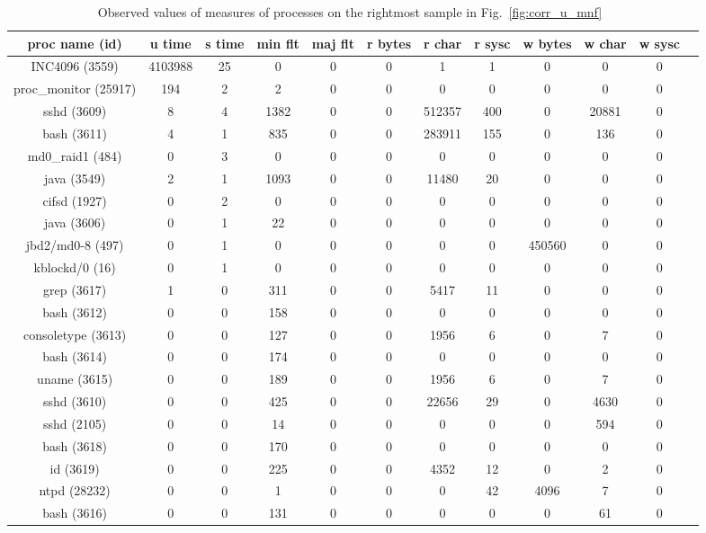 \begin{table}[h]
\begin{center}
\begin{tabular}{|c|c|c|c|c|c|c|c|c|c|c|c|} \hline
proc name (id) & u time & s time & min flt & maj flt & r bytes & r char & r sysc & w bytes & w char & w sysc\\ \hline
INC4096 (3559) & 4103988 & 25 & 0 & 0 & 0 & 1 & 1 & 0 & 0 & 0 \\ \hline
proc\_monitor  (25917)  & 194 & 2 & 2 & 0 & 0 & 0 & 0 & 0 & 0 & 0 \\ \hline
sshd (3609) & 8 & 4 & 1382 & 0 & 0 & 512357 & 400 & 0 & 20881 & 0 \\ \hline
bash (3611)  & 4 & 1 & 835 & 0 & 0 & 283911 & 155 & 0 & 136 & 0 \\ \hline
md0\_raid1 (484) & 0 & 3 & 0 & 0 & 0 & 0 & 0 & 0 & 0 & 0 \\ \hline
java (3549) & 2 & 1 & 1093 & 0 & 0 & 11480 & 20 & 0 & 0 & 0 \\ \hline
cifsd (1927) & 0 & 2 & 0 & 0 & 0 & 0 & 0 & 0 & 0 & 0 \\ \hline
java (3606) & 0 & 1 & 22 & 0 & 0 & 0 & 0 & 0 & 0 & 0 \\ \hline
jbd2/md0-8 (497) & 0 & 1 & 0 & 0 & 0 & 0 & 0 & 450560 & 0 & 0 \\ \hline
kblockd/0 (16) & 0 & 1 & 0 & 0 & 0 & 0 & 0 & 0 & 0 & 0 \\ \hline
grep (3617) & 1 & 0 & 311 & 0 & 0 & 5417 & 11 & 0 & 0 & 0 \\ \hline
bash (3612) & 0 & 0 & 158 & 0 & 0 & 0 & 0 & 0 & 0 & 0 \\ \hline
consoletype (3613) & 0 & 0 & 127 & 0 & 0 & 1956 & 6 & 0 & 7 & 0 \\ \hline
bash (3614) & 0 & 0 & 174 & 0 & 0 & 0 & 0 & 0 & 0 & 0 \\ \hline
uname (3615) & 0 & 0 & 189 & 0 & 0 & 1956  & 6 & 0 & 7 & 0 \\ \hline
sshd (3610) & 0 & 0 & 425 & 0 & 0 & 22656 & 29 & 0 & 4630 & 0 \\ \hline
sshd (2105) & 0 & 0 & 14 & 0 & 0 & 0 & 0 & 0 & 594 & 0 \\ \hline
bash (3618) & 0 & 0 & 170 & 0 & 0 & 0 & 0 & 0 & 0 & 0 \\ \hline
id (3619) & 0 & 0 & 225 & 0 & 0 & 4352 & 12 & 0 & 2 & 0 \\ \hline
ntpd (28232) & 0 & 0 & 1 & 0 & 0 & 0 & 42 & 4096 & 7 & 0 \\ \hline
bash (3616) & 0 & 0 & 131 & 0 & 0 & 0 & 0 & 0 & 61 & 0 \\ \hline
\end{tabular}
\end{center}
\caption{Observed values of measures of processes on the rightmost sample in Fig.~\ref{fig:corr_u_mnf}~\label{tab:breakdown1}}
\end{table}

